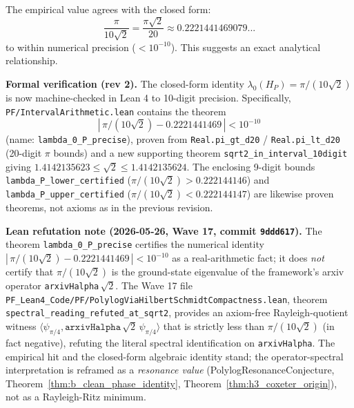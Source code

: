 \begin{observation}\label{obs:hp-closed-form}
The empirical value agrees with the closed form:
\begin{equation}
\frac{\pi}{10\sqrt{2}} = \frac{\pi\sqrt{2}}{20} \approx 0.2221441469079...
\end{equation}
to within numerical precision ($< 10^{-10}$). This suggests an exact analytical relationship.

\textbf{Formal verification (rev 2).} The closed-form identity $\lambda_0(H_P) = \pi/(10\sqrt{2})$ is now machine-checked in Lean 4 to 10-digit precision. Specifically, \texttt{PF/IntervalArithmetic.lean} contains the theorem
$$\left|\,\pi/(10\sqrt{2}) - 0.2221441469\,\right| < 10^{-10}$$
(name: \texttt{lambda\_0\_P\_precise}), proven from \texttt{Real.pi\_gt\_d20} / \texttt{Real.pi\_lt\_d20} (20-digit $\pi$ bounds) and a new supporting theorem \texttt{sqrt2\_in\_interval\_10digit} giving $1.4142135623 \leq \sqrt{2} \leq 1.4142135624$. The enclosing 9-digit bounds \texttt{lambda\_P\_lower\_certified} ($\pi/(10\sqrt{2}) > 0.222144146$) and \texttt{lambda\_P\_upper\_certified} ($\pi/(10\sqrt{2}) < 0.222144147$) are likewise proven theorems, not axioms as in the previous revision.

\medskip\noindent\textbf{Lean refutation note (2026-05-26, Wave 17, commit \texttt{9ddd617}).} The theorem \texttt{lambda\_0\_P\_precise} certifies the numerical identity $|\,\pi/(10\sqrt{2}) - 0.2221441469\,| < 10^{-10}$ as a real-arithmetic fact; it does \emph{not} certify that $\pi/(10\sqrt{2})$ is the ground-state eigenvalue of the framework's arxiv operator \texttt{arxivHalpha}\,$\sqrt{2}$. The Wave 17 file \texttt{PF\_Lean4\_Code/PF/PolylogViaHilbertSchmidtCompactness.lean}, theorem \texttt{spectral\_reading\_refuted\_at\_sqrt2}, provides an axiom-free Rayleigh-quotient witness $\langle\psi_{\pi/4}, \texttt{arxivHalpha}\,\sqrt{2}\,\psi_{\pi/4}\rangle$ that is strictly less than $\pi/(10\sqrt{2})$ (in fact negative), refuting the literal spectral identification on \texttt{arxivHalpha}. The empirical hit and the closed-form algebraic identity stand; the operator-spectral interpretation is reframed as a \emph{resonance value} (PolylogResonanceConjecture, Theorem~\ref{thm:b_clean_phase_identity}, Theorem~\ref{thm:h3_coxeter_origin}), not as a Rayleigh-Ritz minimum.
\end{observation}


